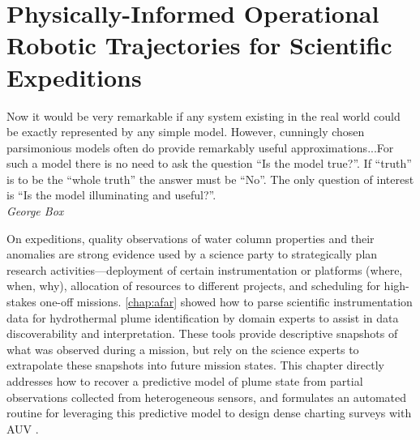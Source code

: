 \chapter{Physically-Informed Operational Robotic Trajectories for Scientific Expeditions}
\label{chap:phortex}

\begin{center}
    \begin{minipage}{0.7\textwidth}
      \begin{small}
        Now it would be very remarkable if any system existing in the real world could be exactly represented by any simple model. However, cunningly chosen parsimonious models often do provide remarkably useful approximations...For such a model there is no need to ask the question ``Is the model true?''. If ``truth'' is to be the ``whole truth'' the answer must be ``No''. The only question of interest is ``Is the model illuminating and useful?''.\\ \emph{George Box}
      \end{small}
    \end{minipage}
    \vspace{0.5cm}
\end{center}


On expeditions, quality observations of water column properties and their anomalies are strong evidence used by a science party to strategically plan research activities---deployment of certain instrumentation or platforms (where, when, why), allocation of resources to different projects, and scheduling for high-stakes one-off missions. \cref{chap:afar} showed how to parse scientific instrumentation data for hydrothermal plume identification by domain experts to assist in data discoverability and interpretation. These tools provide descriptive snapshots of what was observed during a mission, but rely on the science experts to extrapolate these snapshots into future mission states. This chapter directly addresses how to recover a predictive model of plume state from partial observations collected from heterogeneous sensors, and formulates an automated routine for leveraging this predictive model to design dense charting surveys with AUV \Sentry. %

